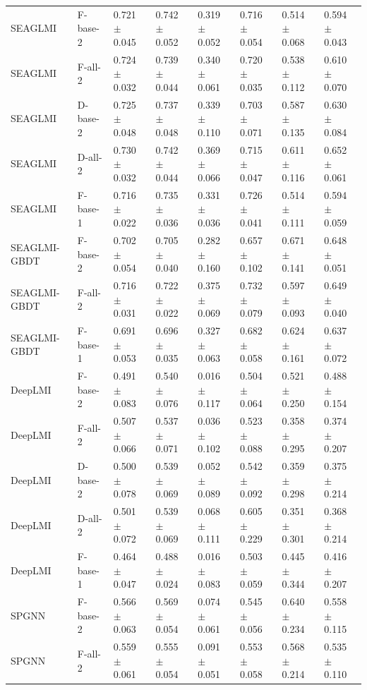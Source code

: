 \begin{landscape}
{\begin{longtable}{llllllll}
SEAGLMI & F-base-2 & 0.721 $\pm$ 0.045 & 0.742 $\pm$ 0.052 & 0.319 $\pm$ 0.052 & 0.716 $\pm$ 0.054 & 0.514 $\pm$ 0.068 & 0.594 $\pm$ 0.043 \\
SEAGLMI & F-all-2 & 0.724 $\pm$ 0.032 & 0.739 $\pm$ 0.044 & 0.340 $\pm$ 0.061 & 0.720 $\pm$ 0.035 & 0.538 $\pm$ 0.112 & 0.610 $\pm$ 0.070 \\
SEAGLMI & D-base-2 & 0.725 $\pm$ 0.048 & 0.737 $\pm$ 0.048 & 0.339 $\pm$ 0.110 & 0.703 $\pm$ 0.071 & 0.587 $\pm$ 0.135 & 0.630 $\pm$ 0.084 \\
SEAGLMI & D-all-2 & 0.730 $\pm$ 0.032 & 0.742 $\pm$ 0.044 & 0.369 $\pm$ 0.066 & 0.715 $\pm$ 0.047 & 0.611 $\pm$ 0.116 & 0.652 $\pm$ 0.061 \\
SEAGLMI & F-base-1 & 0.716 $\pm$ 0.022 & 0.735 $\pm$ 0.036 & 0.331 $\pm$ 0.036 & 0.726 $\pm$ 0.041 & 0.514 $\pm$ 0.111 & 0.594 $\pm$ 0.059 \\
SEAGLMI-GBDT & F-base-2 & 0.702 $\pm$ 0.054 & 0.705 $\pm$ 0.040 & 0.282 $\pm$ 0.160 & 0.657 $\pm$ 0.102 & 0.671 $\pm$ 0.141 & 0.648 $\pm$ 0.051 \\
SEAGLMI-GBDT & F-all-2 & 0.716 $\pm$ 0.031 & 0.722 $\pm$ 0.022 & 0.375 $\pm$ 0.069 & 0.732 $\pm$ 0.079 & 0.597 $\pm$ 0.093 & 0.649 $\pm$ 0.040 \\
SEAGLMI-GBDT & F-base-1 & 0.691 $\pm$ 0.053 & 0.696 $\pm$ 0.035 & 0.327 $\pm$ 0.063 & 0.682 $\pm$ 0.058 & 0.624 $\pm$ 0.161 & 0.637 $\pm$ 0.072 \\
DeepLMI & F-base-2 & 0.491 $\pm$ 0.083 & 0.540 $\pm$ 0.076 & 0.016 $\pm$ 0.117 & 0.504 $\pm$ 0.064 & 0.521 $\pm$ 0.250 & 0.488 $\pm$ 0.154 \\
DeepLMI & F-all-2 & 0.507 $\pm$ 0.066 & 0.537 $\pm$ 0.071 & 0.036 $\pm$ 0.102 & 0.523 $\pm$ 0.088 & 0.358 $\pm$ 0.295 & 0.374 $\pm$ 0.207 \\
DeepLMI & D-base-2 & 0.500 $\pm$ 0.078 & 0.539 $\pm$ 0.069 & 0.052 $\pm$ 0.089 & 0.542 $\pm$ 0.092 & 0.359 $\pm$ 0.298 & 0.375 $\pm$ 0.214 \\
DeepLMI & D-all-2 & 0.501 $\pm$ 0.072 & 0.539 $\pm$ 0.069 & 0.068 $\pm$ 0.111 & 0.605 $\pm$ 0.229 & 0.351 $\pm$ 0.301 & 0.368 $\pm$ 0.214 \\
DeepLMI & F-base-1 & 0.464 $\pm$ 0.047 & 0.488 $\pm$ 0.024 & 0.016 $\pm$ 0.083 & 0.503 $\pm$ 0.059 & 0.445 $\pm$ 0.344 & 0.416 $\pm$ 0.207 \\
SPGNN & F-base-2 & 0.566 $\pm$ 0.063 & 0.569 $\pm$ 0.054 & 0.074 $\pm$ 0.061 & 0.545 $\pm$ 0.056 & 0.640 $\pm$ 0.234 & 0.558 $\pm$ 0.115 \\
SPGNN & F-all-2 & 0.559 $\pm$ 0.061 & 0.555 $\pm$ 0.054 & 0.091 $\pm$ 0.051 & 0.553 $\pm$ 0.058 & 0.568 $\pm$ 0.214 & 0.535 $\pm$ 0.110 \\

\end{longtable}}
\end{landscape}
